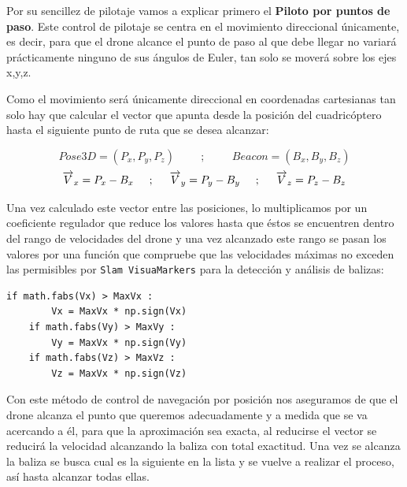 \hspace{1cm} Por su sencillez de pilotaje vamos a explicar primero el \textbf{Piloto por puntos de paso}. Este control de pilotaje se centra en el movimiento direccional únicamente, es decir, para que el drone alcance el punto de paso al que debe llegar no variará prácticamente ninguno de sus ángulos de Euler, tan solo se moverá sobre los ejes x,y,z.

\hspace{1cm} Como el movimiento será únicamente direccional en coordenadas cartesianas tan solo hay que calcular el vector que apunta desde la posición del cuadricóptero hasta el siguiente punto de ruta que se desea alcanzar: 

\[Pose3D = (P_{x}, P_{y}, P_{z})\hspace{1cm};\hspace{1cm}Beacon = (B_{x}, B_{y}, B_{z})\]
\[\overrightarrow{V}_{x} = P_{x} - B_{x}\hspace{0.5cm};\hspace{0.5cm}\overrightarrow{V}_{y} = P_{y} - B_{y}\hspace{0.5cm};\hspace{0.5cm}\overrightarrow{V}_{z} = P_{z} - B_{z}\]

\hspace{1cm} Una vez calculado este vector entre las posiciones, lo multiplicamos por un coeficiente regulador que reduce los valores hasta que éstos se encuentren dentro del rango de velocidades del drone y una vez alcanzado este rango se pasan los valores por una función que compruebe que las velocidades máximas no exceden las permisibles por \texttt{Slam VisuaMarkers} para la detección y análisis de balizas: 

\begin{lstlisting}[backgroundcolor=\color{gray!15}]
    if math.fabs(Vx) > MaxVx :
        Vx = MaxVx * np.sign(Vx)
    if math.fabs(Vy) > MaxVy :
        Vy = MaxVx * np.sign(Vy)
    if math.fabs(Vz) > MaxVz :
        Vz = MaxVx * np.sign(Vz)        
\end{lstlisting}

\hspace{1cm} Con este método de control de navegación por posición nos aseguramos de que el drone alcanza el punto que queremos adecuadamente y a medida que se va acercando a él, para que la aproximación sea exacta, al reducirse el vector se reducirá la velocidad alcanzando la baliza con total exactitud. Una vez se alcanza la baliza se busca cual es la siguiente en la lista y se vuelve a realizar el proceso, así hasta alcanzar todas ellas.

